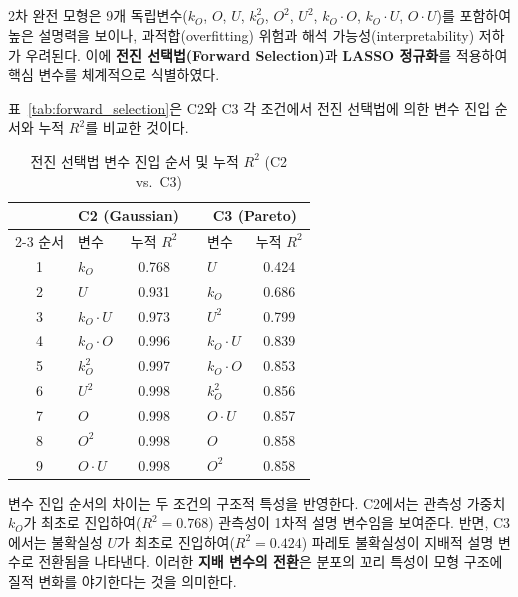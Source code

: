 \subsection{}
\label{subsec:variable_selection}

2차 완전 모형은 9개 독립변수($k_O$, $O$, $U$, $k_O^2$, $O^2$, $U^2$,
$k_O \cdot O$, $k_O \cdot U$, $O \cdot U$)를 포함하여 높은 설명력을 보이나,
과적합(overfitting) 위험과 해석 가능성(interpretability) 저하가 우려된다.
이에 \textbf{전진 선택법(Forward Selection)}과 \textbf{LASSO 정규화}를
적용하여 핵심 변수를 체계적으로 식별하였다.

\p{[}표~\vref{tab:forward_selection}\p{]}은 C2와 C3 각 조건에서 전진 선택법에 의한
변수 진입 순서와 누적 $R^2$를 비교한 것이다.

\begin{table}[htbp]
  \centering
  \caption{전진 선택법 변수 진입 순서 및 누적 $R^2$ (C2 vs.\ C3)}
  \label{tab:forward_selection}
  \small
  \begin{tabular}{c l c c l c}
    \toprule
    & \multicolumn{2}{c}{\textbf{C2 (Gaussian)}} & & \multicolumn{2}{c}{\textbf{C3 (Pareto)}} \\
    \cmidrule{2-3} \cmidrule{5-6}
    순서 & 변수 & 누적 $R^2$ & & 변수 & 누적 $R^2$ \\
    \midrule
    1 & $k_O$ & 0.768 & & $U$ & 0.424 \\
    2 & $U$ & 0.931 & & $k_O$ & 0.686 \\
    3 & $k_O \cdot U$ & 0.973 & & $U^2$ & 0.799 \\
    4 & $k_O \cdot O$ & 0.996 & & $k_O \cdot U$ & 0.839 \\
    5 & $k_O^2$ & 0.997 & & $k_O \cdot O$ & 0.853 \\
    6 & $U^2$ & 0.998 & & $k_O^2$ & 0.856 \\
    7 & $O$ & 0.998 & & $O \cdot U$ & 0.857 \\
    8 & $O^2$ & 0.998 & & $O$ & 0.858 \\
    9 & $O \cdot U$ & 0.998 & & $O^2$ & 0.858 \\
    \bottomrule
  \end{tabular}
\end{table}

변수 진입 순서의 차이는 두 조건의 구조적 특성을 반영한다.
C2에서는 관측성 가중치 $k_O$가 최초로 진입하여($R^2 = 0.768$)
관측성이 1차적 설명 변수임을 보여준다.
반면, C3에서는 불확실성 $U$가 최초로 진입하여($R^2 = 0.424$)
파레토 불확실성이 지배적 설명 변수로 전환됨을 나타낸다.
이러한 \textbf{지배 변수의 전환}은 분포의 꼬리 특성이
모형 구조에 질적 변화를 야기한다는 것을 의미한다.

